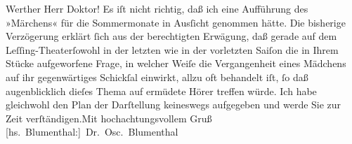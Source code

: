 \pstart\center{}Werther Herr Doktor!\pend\vspace{0.5em}
\pstart
           Es iſt nicht richtig, daß ich eine Aufführung des »Märchens« für die Sommermonate in Ausſicht genommen hätte. Die
               bisherige Verzögerung erklärt{ }ſich aus der berechtigten Erwägung, daß gerade auf dem
                  Leſſing-Theaterſowohl in der letzten wie in der vorletzten Saiſon
               die in Ihrem Stücke
               aufgeworfene Frage, in welcher Weiſe die Vergangenheit eines Mädchens auf ihr
               gegenwärtiges Schickſal einwirkt, allzu oft behandelt iſt,{ }ſo daß augenblicklich
               dieſes Thema auf ermüdete Hörer treffen würde. Ich habe gleichwohl den Plan der
               Darſtellung keineswegs aufgegeben und werde Sie zur Zeit verſtändigen.\hspace*{2.5em}Mit hochachtungsvollem Gruß\pend
           \pstart \spacefill\mbox{{[}hs. Blumenthal:{]} Dr. Osc. Blumenthal}\pend{}\endnumbering{}  \newcommand{\dateiname}{L00253}\newcommand{\titel}{Oscar Blumenthal an Arthur Schnitzler, 12. 8. 1893}\newcommand{\editorInnen}{Martin Anton Müller und Gerd-Hermann Susen}
